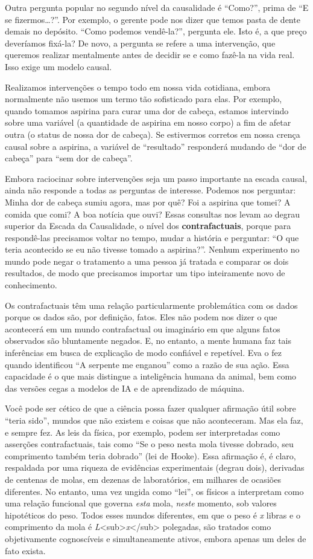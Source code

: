 \documentclass[11pt,a5paper,twoside]{book}
\begin{document}
Outra pergunta popular no segundo nível da causalidade é “Como?”, prima de “E se fizermos…?”. Por exemplo, o gerente pode nos dizer que temos pasta de dente demais no depósito. “Como podemos vendê-la?”, pergunta ele. Isto é, a que preço deveríamos fixá-la? De novo, a pergunta se refere a uma intervenção, que queremos realizar mentalmente antes de decidir se e como fazê-la na vida real. Isso exige um modelo causal.

Realizamos intervenções o tempo todo em nossa vida cotidiana, embora normalmente não usemos um termo tão sofisticado para elas. Por exemplo, quando tomamos aspirina para curar uma dor de cabeça, estamos intervindo sobre uma variável (a quantidade de aspirina em nosso corpo) a fim de afetar outra (o status de nossa dor de cabeça). Se estivermos corretos em nossa crença causal sobre a aspirina, a variável de “resultado” responderá mudando de “dor de cabeça” para “sem dor de cabeça”.

Embora raciocinar sobre intervenções seja um passo importante na escada causal, ainda não responde a todas as perguntas de interesse. Podemos nos perguntar: Minha dor de cabeça sumiu agora, mas por quê? Foi a aspirina que tomei? A comida que comi? A boa notícia que ouvi? Essas consultas nos levam ao degrau superior da Escada da Causalidade, o nível dos \textbf{contrafactuais}, porque para respondê-las precisamos voltar no tempo, mudar a história e perguntar: “O que teria acontecido se eu não tivesse tomado a aspirina?”. Nenhum experimento no mundo pode negar o tratamento a uma pessoa já tratada e comparar os dois resultados, de modo que precisamos importar um tipo inteiramente novo de conhecimento.

Os contrafactuais têm uma relação particularmente problemática com os dados porque os dados são, por definição, fatos. Eles não podem nos dizer o que acontecerá em um mundo contrafactual ou imaginário em que alguns fatos observados são bluntamente negados. E, no entanto, a mente humana faz tais inferências em busca de explicação de modo confiável e repetível. Eva o fez quando identificou “A serpente me enganou” como a razão de sua ação. Essa capacidade é o que mais distingue a inteligência humana da animal, bem como das versões cegas a modelos de IA e de aprendizado de máquina.

Você pode ser cético de que a ciência possa fazer qualquer afirmação útil sobre “teria sido”, mundos que não existem e coisas que não aconteceram. Mas ela faz, e sempre fez. As leis da física, por exemplo, podem ser interpretadas como asserções contrafactuais, tais como “Se o peso nesta mola tivesse dobrado, seu comprimento também teria dobrado” (lei de Hooke). Essa afirmação é, é claro, respaldada por uma riqueza de evidências experimentais (degrau dois), derivadas de centenas de molas, em dezenas de laboratórios, em milhares de ocasiões diferentes. No entanto, uma vez ungida como “lei”, os físicos a interpretam como uma relação funcional que governa \textit{esta} mola, \textit{neste} momento, sob valores hipotéticos do peso. Todos esses mundos diferentes, em que o peso é \textit{x} libras e o comprimento da mola é \textit{L}<sub>\textit{x}</sub> polegadas, são tratados como objetivamente cognoscíveis e simultaneamente ativos, embora apenas um deles de fato exista.
\end{document}
